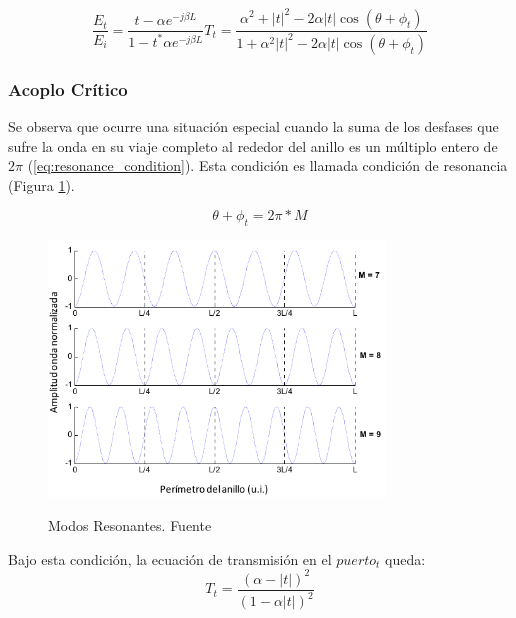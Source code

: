 \begin{subequations}
\begin{equation}
    \frac{E_t}{E_i} = 
	\frac{t - \alpha e^{-j \beta L}} {1 - t^* \alpha e^{-j \beta L}} 
\label{eq:t_through_notch} 
\end{equation}
\begin{equation}
     T_t = \frac{\alpha^2 + |t|^2 - 2\alpha |t| \cos(\theta + \phi_t) }
             {1 + \alpha^2|t|^2 - 2\alpha |t| \cos(\theta + \phi_t) }
\label{eq:T_t_notch}
\end{equation} 
\end{subequations}

\subsubsection{Acoplo Crítico}

Se observa que ocurre una situación especial cuando la suma de los desfases que
sufre la onda en su viaje completo al rededor del anillo es un múltiplo entero
de $2\pi$ (\ref{eq:resonance_condition}). 
Esta condición es llamada condición de resonancia (Figura \ref{fig:resonant_modes}).

\begin{equation}
\theta + \phi_t = 2\pi * M
\label{eq:resonance_condition}
\end{equation} 

\begin{figure}[h!]
\caption{Modos Resonantes. Fuente\cite{blasco2011desarrollo}}
\centering
\includegraphics[width=0.8\textwidth,natwidth=537,natheight=437]{figs/resonant_modes.png}
\label{fig:resonant_modes}
\end{figure} 

Bajo esta condición, la ecuación de transmisión en el $puerto_t$ queda:
\begin{equation}
T_t=\frac{(\alpha - |t|)^2}{(1-\alpha|t|)^2}
\label{eq:t_resonance}
\end{equation} 

